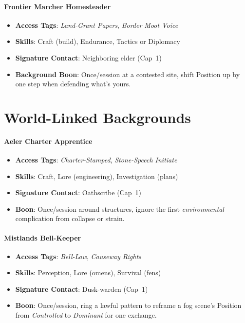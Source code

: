 \paragraph{Frontier Marcher Homesteader}
\begin{itemize}
\item \textbf{Access Tags}: \textit{Land-Grant Papers}, \textit{Border Moot Voice}
\item \textbf{Skills}: Craft (build), Endurance, Tactics or Diplomacy
\item \textbf{Signature Contact}: Neighboring elder (Cap~1)
\item \textbf{Background Boon}: Once/session at a contested site, shift Position up by one step when defending what's yours.
\end{itemize}

\section{World-Linked Backgrounds}

\paragraph{Aeler Charter Apprentice}
\begin{itemize}
\item \textbf{Access Tags}: \textit{Charter-Stamped}, \textit{Stone-Speech Initiate}
\item \textbf{Skills}: Craft, Lore (engineering), Investigation (plans)
\item \textbf{Signature Contact}: Oathscribe (Cap~1)
\item \textbf{Boon}: Once/session around structures, ignore the first \emph{environmental} complication from collapse or strain.
\end{itemize}

\paragraph{Mistlands Bell-Keeper}
\begin{itemize}
\item \textbf{Access Tags}: \textit{Bell-Law}, \textit{Causeway Rights}
\item \textbf{Skills}: Perception, Lore (omens), Survival (fens)
\item \textbf{Signature Contact}: Dusk-warden (Cap~1)
\item \textbf{Boon}: Once/session, ring a lawful pattern to reframe a fog scene's Position from \emph{Controlled} to \emph{Dominant} for one exchange.
\end{itemize}

